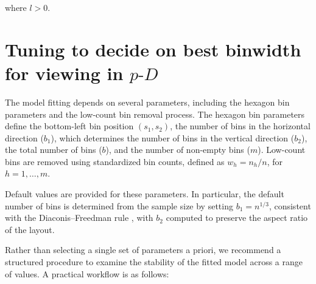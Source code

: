 \documentclass[
  12pt]{article}
\newcommand\pD{$p\text{-}D$}
\begin{document}
where \(l > 0\).

\section{\texorpdfstring{Tuning to decide on best binwidth for viewing
in
\pD{}}{Tuning to decide on best binwidth for viewing in }}\label{sec-tuning}

The model fitting depends on several parameters, including the hexagon
bin parameters and the low-count bin removal process. The hexagon bin
parameters define the bottom-left bin position \((s_1, s_2)\), the
number of bins in the horizontal direction (\(b_1\)), which determines
the number of bins in the vertical direction (\(b_2\)), the total number
of bins (\(b\)), and the number of non-empty bins (\(m\)). Low-count
bins are removed using standardized bin counts, defined as
\(w_h = n_h/n\), for \(h = 1, \dots, m\).

Default values are provided for these parameters. In particular, the
default number of bins is determined from the sample size by setting
\(b_1 = n^{1/3}\), consistent with the Diaconis--Freedman rule
\citep{freedman1981}, with \(b_2\) computed to preserve the aspect ratio
of the layout.

Rather than selecting a single set of parameters a priori, we recommend
a structured procedure to examine the stability of the fitted model
across a range of values. A practical workflow is as follows:
\end{document}
